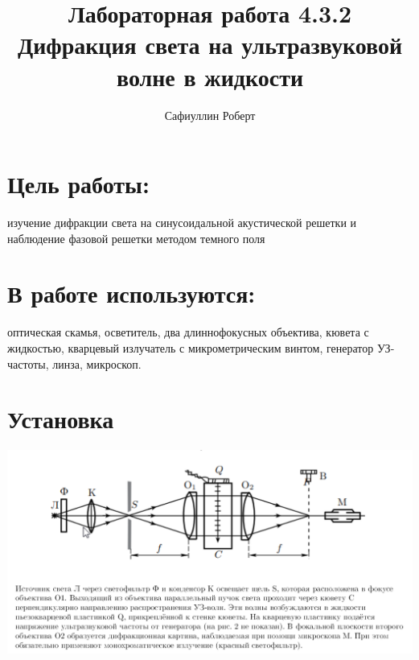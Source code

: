 \documentclass[a4paper,12pt]{article} %
\author{Сафиуллин Роберт	}
\title{Лабораторная работа  4.3.2\\ Дифракция света на ультразвуковой волне в жидкости}
\begin{document}

\maketitle


\newpage

\section{Цель работы:}
изучение дифракции света на синусоидальной акустической решетки и наблюдение фазовой решетки методом темного поля
\\
\section{В работе используются:}
оптическая скамья, осветитель, два длиннофокусных объектива, кювета с жидкостью,
кварцевый излучатель с микрометрическим винтом, генератор УЗ-частоты, линза, микроскоп.
 
        \section{Установка}
        \begin{center}
        \includegraphics[scale=0.7]{ust}
        \end{center}
\end{document}
